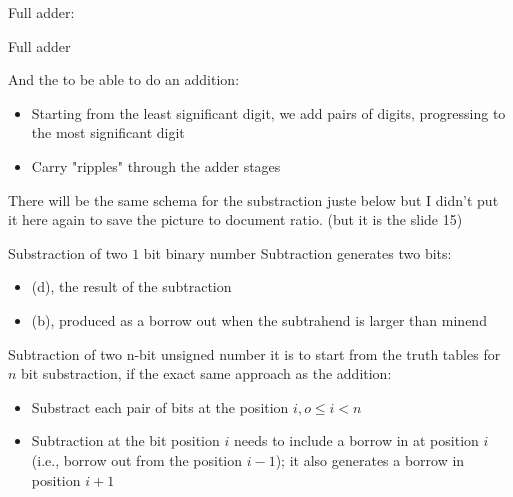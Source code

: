 \begin{parag}{Full adder:}
\begin{subparag}{Full adder}
\begin{center}
        \end{center}
   \end{subparag}
   And the to be able to do an addition:
   \begin{itemize}
       \item Starting from the least significant digit, we add pairs of digits, progressing to the most significant digit
       \item Carry "ripples" through the adder stages
   \end{itemize}
   \begin{framedremark}
       There will be the same schema for the substraction juste below but I didn't put it here again to save the picture to document ratio. (but it is the slide 15)
   \end{framedremark}
   
\end{parag}
\begin{parag}{Substraction of two $1$ bit binary number}
    Subtraction generates two bits:
    \begin{itemize}
        \item {} (d), the result of the subtraction
        \item {} (b), produced as a borrow out when the subtrahend is larger than minend
    \end{itemize}
\end{parag}
\begin{parag}{Subtraction of two n-bit unsigned number}
    it is  to start from the truth tables for $n$ bit substraction, if the exact same approach as the addition:
    \begin{itemize}
        \item Substract each pair of bits at the position $i, o \leq i < n$
        \item Subtraction at the bit position $i$ needs to include a borrow in at position $i$ (i.e., borrow out from the position $i - 1$); it also generates a borrow in position $i + 1$
    \end{itemize}

\end{parag}
